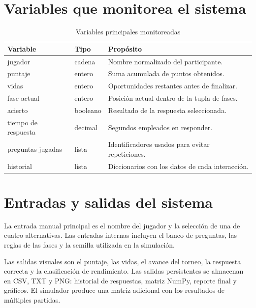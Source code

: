 \documentclass[stu,12pt,a4paper,biblatex,floatsintext]{apa7}
\begin{document}
\section{Variables que monitorea el sistema}

\begin{table}[htbp]
  \centering
  \caption{Variables principales monitoreadas}
  \begin{tabular}{p{}p{}p{}}
    \toprule
    \rowcolor{utpAzulClaro}
    \textcolor{utpAzul}{\textbf{Variable}} & \textcolor{utpAzul}{\textbf{Tipo}} & \textcolor{utpAzul}{\textbf{Propósito}} \\
    \midrule
    jugador & cadena & Nombre normalizado del participante. \\
    puntaje & entero & Suma acumulada de puntos obtenidos. \\
    vidas & entero & Oportunidades restantes antes de finalizar. \\
    fase actual & entero & Posición actual dentro de la tupla de fases. \\
    acierto & booleano & Resultado de la respuesta seleccionada. \\
    tiempo de respuesta & decimal & Segundos empleados en responder. \\
    preguntas jugadas & lista & Identificadores usados para evitar repeticiones. \\
    historial & lista & Diccionarios con los datos de cada interacción. \\
    \bottomrule
  \end{tabular}
\end{table}

\section{Entradas y salidas del sistema}

La entrada manual principal es el nombre del jugador y la selección de una de cuatro alternativas. Las entradas internas incluyen el banco de preguntas, las reglas de las fases y la semilla utilizada en la simulación.

Las salidas visuales son el puntaje, las vidas, el avance del torneo, la respuesta correcta y la clasificación de rendimiento. Las salidas persistentes se almacenan en CSV, TXT y PNG: historial de respuestas, matriz NumPy, reporte final y gráficos. El simulador produce una matriz adicional con los resultados de múltiples partidas.
\end{document}
